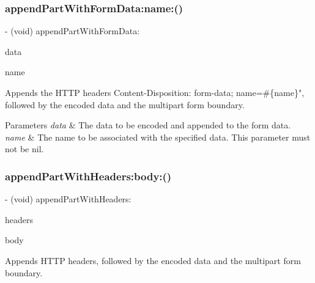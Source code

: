\subsubsection{\texorpdfstring{append\+Part\+With\+Form\+Data\+:name\+:()}{appendPartWithFormData:name:()}\hspace{0.1cm}{\footnotesize\ttfamily [3/3]}}
{\footnotesize\ttfamily -\/ (void) append\+Part\+With\+Form\+Data\+: \begin{DoxyParamCaption}\item[{(N\+S\+Data $\ast$)}]{data }\item[{name:(N\+S\+String $\ast$)}]{name }\end{DoxyParamCaption}}

Appends the H\+T\+TP headers {\ttfamily Content-\/\+Disposition\+: form-\/data; name=\#\{name\}"}, followed by the encoded data and the multipart form boundary.


\begin{DoxyParams}{Parameters}
{\em data} & The data to be encoded and appended to the form data. \\
\hline
{\em name} & The name to be associated with the specified data. This parameter must not be {\ttfamily nil}. \\
\hline
\end{DoxyParams}
\mbox{\label{protocol_a_f_multipart_form_data-p_a536920b65bcc076f33cb823ebb76ecc0}} 
\subsubsection{\texorpdfstring{append\+Part\+With\+Headers\+:body\+:()}{appendPartWithHeaders:body:()}\hspace{0.1cm}{\footnotesize\ttfamily [1/3]}}
{\footnotesize\ttfamily -\/ (void) append\+Part\+With\+Headers\+: \begin{DoxyParamCaption}\item[{(nullable N\+S\+Dictionary $\ast$)}]{headers }\item[{body:(N\+S\+Data $\ast$)}]{body }\end{DoxyParamCaption}}

Appends H\+T\+TP headers, followed by the encoded data and the multipart form boundary.


